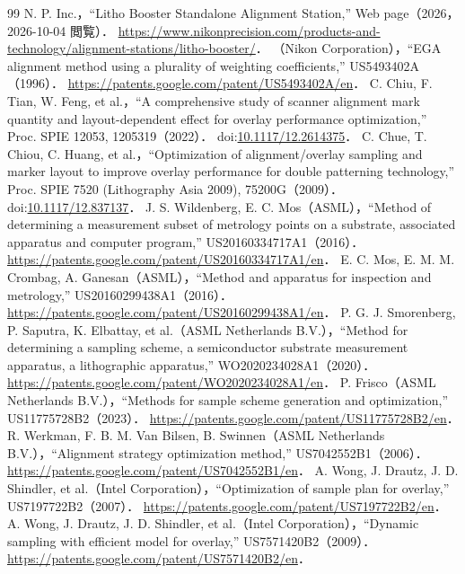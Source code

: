 \documentclass[10.5pt,a4paper]{ltjsarticle}
\begin{document}
\begin{thebibliography}{99}
 N. P. Inc.，``Litho Booster Standalone Alignment Station,'' Web page（2026，2026-10-04 閲覧）． \url{https://www.nikonprecision.com/products-and-technology/alignment-stations/litho-booster/}．
 （Nikon Corporation），``EGA alignment method using a plurality of weighting coefficients,'' US5493402A（1996）． \url{https://patents.google.com/patent/US5493402A/en}．
 C. Chiu, F. Tian, W. Feng, et al.，``A comprehensive study of scanner alignment mark quantity and layout-dependent effect for overlay performance optimization,'' Proc. SPIE 12053, 1205319（2022）． doi:\href{https://doi.org/10.1117/12.2614375}{10.1117/12.2614375}．
 C. Chue, T. Chiou, C. Huang, et al.，``Optimization of alignment/overlay sampling and marker layout to improve overlay performance for double patterning technology,'' Proc. SPIE 7520 (Lithography Asia 2009), 75200G（2009）． doi:\href{https://doi.org/10.1117/12.837137}{10.1117/12.837137}．
 J. S. Wildenberg, E. C. Mos（ASML），``Method of determining a measurement subset of metrology points on a substrate, associated apparatus and computer program,'' US20160334717A1（2016）． \url{https://patents.google.com/patent/US20160334717A1/en}．
 E. C. Mos, E. M. M. Crombag, A. Ganesan（ASML），``Method and apparatus for inspection and metrology,'' US20160299438A1（2016）． \url{https://patents.google.com/patent/US20160299438A1/en}．
 P. G. J. Smorenberg, P. Saputra, K. Elbattay, et al.（ASML Netherlands B.V.），``Method for determining a sampling scheme, a semiconductor substrate measurement apparatus, a lithographic apparatus,'' WO2020234028A1（2020）． \url{https://patents.google.com/patent/WO2020234028A1/en}．
 P. Frisco（ASML Netherlands B.V.），``Methods for sample scheme generation and optimization,'' US11775728B2（2023）． \url{https://patents.google.com/patent/US11775728B2/en}．
 R. Werkman, F. B. M. Van Bilsen, B. Swinnen（ASML Netherlands B.V.），``Alignment strategy optimization method,'' US7042552B1（2006）． \url{https://patents.google.com/patent/US7042552B1/en}．
 A. Wong, J. Drautz, J. D. Shindler, et al.（Intel Corporation），``Optimization of sample plan for overlay,'' US7197722B2（2007）． \url{https://patents.google.com/patent/US7197722B2/en}．
 A. Wong, J. Drautz, J. D. Shindler, et al.（Intel Corporation），``Dynamic sampling with efficient model for overlay,'' US7571420B2（2009）． \url{https://patents.google.com/patent/US7571420B2/en}．

\end{thebibliography}
\end{document}
